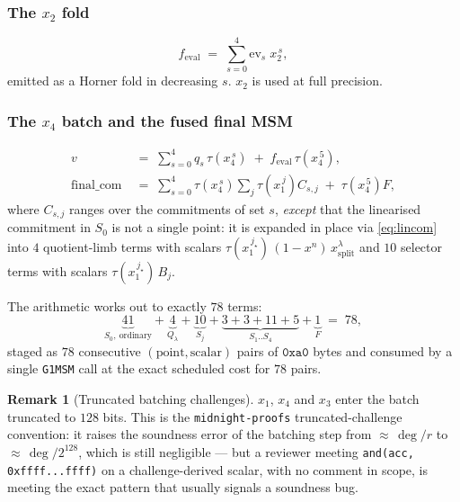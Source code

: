\documentclass[11pt,a4paper]{article}
\newcommand{\trunc}{\ensuremath{\tau}}
\newcommand{\code}[1]{\texttt{#1}}
\theoremstyle{definition}
\newtheorem{remark}{Remark}[section]
\begin{document}
\subsubsection{The \texorpdfstring{$x_2$}{x2} fold}

\begin{equation}
f_{\mathrm{eval}} \;=\; \sum_{s=0}^{4} \mathrm{ev}_s\; x_2^{\,s},
\end{equation}
emitted as a Horner fold in decreasing $s$. $x_2$ is used at full precision.

\subsubsection{The \texorpdfstring{$x_4$}{x4} batch and the fused final MSM}

\begin{align}
v &\;=\; \sum_{s=0}^{4} q_s\,\trunc\!\left(x_4^{\,s}\right)
        \;+\; f_{\mathrm{eval}}\,\trunc\!\left(x_4^{\,5}\right),
\label{eq:v}\\[1mm]
\mathrm{final\_com}
&\;=\;
\sum_{s=0}^{4} \trunc\!\left(x_4^{\,s}\right)
   \sum_{j} \trunc\!\left(x_1^{\,j}\right) C_{s,j}
\;+\;
\trunc\!\left(x_4^{\,5}\right) F,
\label{eq:finalcom}
\end{align}
where $C_{s,j}$ ranges over the commitments of set $s$, \emph{except} that the
linearised commitment in $S_0$ is not a single point: it is expanded in place
via \eqref{eq:lincom} into $4$ quotient-limb terms with scalars
$\trunc(x_1^{\,j_\star})\,(1-x^{n})\,x_{\mathrm{split}}^{\lambda}$ and $10$
selector terms with scalars $\trunc(x_1^{\,j_\star})\,B_j$.

The arithmetic works out to exactly $78$ terms:
\[
\underbrace{41}_{S_0,\ \text{ordinary}}
+ \underbrace{4}_{Q_\lambda} + \underbrace{10}_{S_j}
+ \underbrace{3+3+11+5}_{S_1..S_4}
+ \underbrace{1}_{F}
\;=\; 78,
\]
staged as $78$ consecutive $(\text{point},\text{scalar})$ pairs of
$\mathtt{0xa0}$ bytes and consumed by a single \code{G1MSM} call at the exact
scheduled cost for $78$ pairs.

\begin{remark}[Truncated batching challenges]
$x_1$, $x_4$ and $x_3$ enter the batch truncated to $128$ bits. This is the
\code{midnight-proofs} truncated-challenge convention: it raises the soundness
error of the batching step from ${\approx}\,\deg/r$ to
${\approx}\,\deg/2^{128}$, which is still negligible --- but a reviewer meeting
\code{and(acc, 0xffff...ffff)} on a challenge-derived scalar, with no comment in
scope, is meeting the exact pattern that usually signals a soundness bug.
\end{remark}
\end{document}
